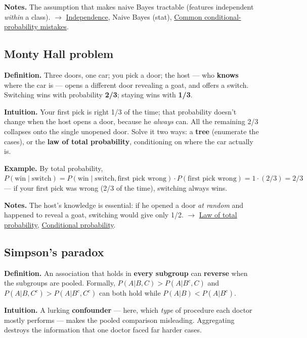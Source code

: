 \documentclass[11pt,a4paper]{article}
\begin{document}
\textbf{Notes.} The assumption that makes naive Bayes tractable (features independent \textit{within} a class). $\to$ \hyperref[sec:independence]{Independence}, Naive Bayes (stat), \hyperref[sec:common-conditional-probability-mistakes]{Common conditional-probability mistakes}.

\subsection{Monty Hall problem}\label{sec:monty-hall-problem}

\textbf{Definition.} Three doors, one car; you pick a door; the host --- who \textbf{knows} where the car is --- opens a different door revealing a goat, and offers a switch. Switching wins with probability \textbf{2/3}; staying wins with \textbf{1/3}.

\textbf{Intuition.} Your first pick is right 1/3 of the time; that probability doesn't change when the host opens a door, because he \textit{always} can. All the remaining 2/3 collapses onto the single unopened door. Solve it two ways: a \textbf{tree} (enumerate the cases), or the \textbf{law of total probability}, conditioning on where the car actually is.

\textbf{Example.} By total probability, $P(\text{win} \mid \text{switch}) = P(\text{win} \mid \text{switch}, \text{first pick wrong})\cdot P(\text{first pick wrong}) = 1 \cdot  (2/3) = 2/3$ --- if your first pick was wrong (2/3 of the time), switching always wins.

\textbf{Notes.} The host's knowledge is essential: if he opened a door \textit{at random} and happened to reveal a goat, switching would give only 1/2. $\to$ \hyperref[sec:law-of-total-probability]{Law of total probability}, \hyperref[sec:conditional-probability]{Conditional probability}.

\subsection{Simpson's paradox}\label{sec:simpsons-paradox}

\textbf{Definition.} An association that holds in \textbf{every subgroup} can \textbf{reverse} when the subgroups are pooled. Formally, $P(A|B, C) > P(A|B^{c}, C)$ and $P(A|B, C^{c}) > P(A|B^{c}, C^{c})$ can both hold while $P(A|B) < P(A|B^{c})$.

\textbf{Intuition.} A lurking \textbf{confounder} --- here, which \textit{type} of procedure each doctor mostly performs --- makes the pooled comparison misleading. Aggregating destroys the information that one doctor faced far harder cases.
\end{document}
